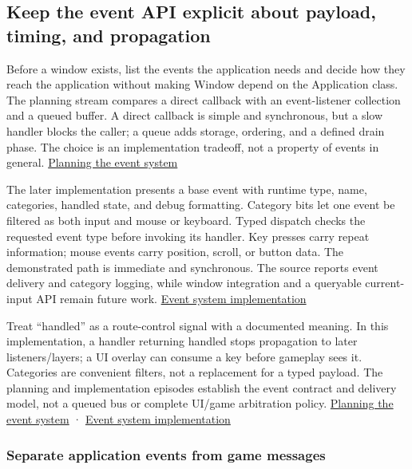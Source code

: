 \subsection{Keep the event API explicit about payload, timing, and propagation}\label{05-engine-i-ch013-keep-the-event-api-explicit-about-payload-timing-and-propagation}

Before a window exists, list the events the application needs and decide how they reach the application without making Window depend on the Application class. The planning stream compares a direct callback with an event-listener collection and a queued buffer. A direct callback is simple and synchronous, but a slow handler blocks the caller; a queue adds storage, ordering, and a defined drain phase. The choice is an implementation tradeoff, not a property of events in general. \href{https://www.youtube.com/watch?v=5mlziHwq90k}{Planning the event system}

The later implementation presents a base event with runtime type, name, categories, handled state, and debug formatting. Category bits let one event be filtered as both input and mouse or keyboard. Typed dispatch checks the requested event type before invoking its handler. Key presses carry repeat information; mouse events carry position, scroll, or button data. The demonstrated path is immediate and synchronous. The source reports event delivery and category logging, while window integration and a queryable current-input API remain future work. \href{https://www.youtube.com/watch?v=xnopUoZbMEk}{Event system implementation}

Treat ``handled'' as a route-control signal with a documented meaning. In this implementation, a handler returning handled stops propagation to later listeners/layers; a UI overlay can consume a key before gameplay sees it. Categories are convenient filters, not a replacement for a typed payload. The planning and implementation episodes establish the event contract and delivery model, not a queued bus or complete UI/game arbitration policy. \href{https://www.youtube.com/watch?v=5mlziHwq90k}{Planning the event system} · \href{https://www.youtube.com/watch?v=xnopUoZbMEk}{Event system implementation}

\subsubsection{Separate application events from game messages}\label{05-engine-i-ch013-separate-application-events-from-game-messages}

